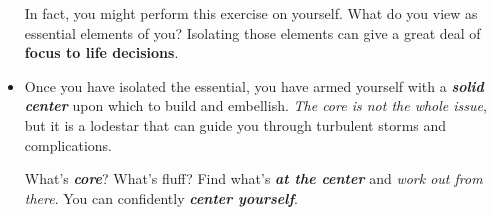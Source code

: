 \documentclass[11pt]{article}
\begin{document}
\begin{itemize}
\begin{exercise}
In fact, you might perform this exercise on yourself. What do you view as essential elements of you? Isolating those elements can give a great deal of \textbf{focus to life decisions}.
\end{exercise}

\item Once you have isolated the essential, you have armed yourself with a \emph{\textbf{solid center}} upon which to build and embellish. \emph{The core is not the whole issue}, but it is a lodestar that can guide you through turbulent storms and complications. 

What’s \emph{\textbf{core}}? What’s fluff? Find what’s \emph{\textbf{at the center}} and \emph{work out from there}. You can confidently \emph{\textbf{center yourself}}.
\end{itemize}
\end{document}
